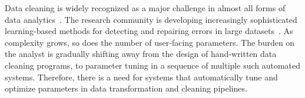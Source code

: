 


Data cleaning is widely recognized as a major challenge in almost all forms of data analytics~\cite{nytimes}. 
The research community is developing increasingly sophisticated learning-based methods for detecting and repairing errors in large datasets~\cite{dc, rekatsinas2017holoclean, DBLP:journals/pvldb/KrishnanWWFG16, DBLP:conf/sigmod/ChuIKW16, mudgal2018deep, doan2018toward}.
As complexity grows, so does the number of user-facing parameters.
The burden on the analyst is gradually shifting away from the design of hand-written data cleaning programs, to parameter tuning in a sequence of multiple such automated systems.
Therefore, there is a need for systems that automatically tune and optimize parameters in data transformation and cleaning pipelines.



% 
% 
% 
% 
% 


